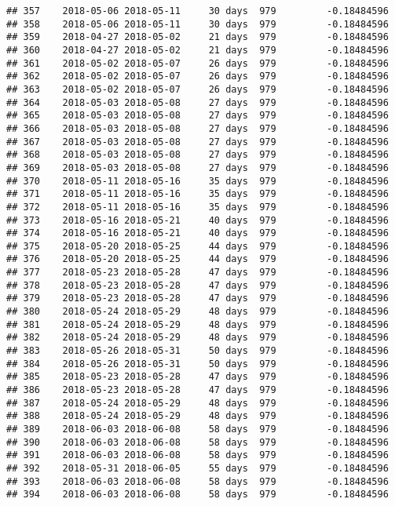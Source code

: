 \documentclass[]{article}
\begin{document}
\begin{verbatim}
## 357    2018-05-06 2018-05-11     30 days  979         -0.18484596
## 358    2018-05-06 2018-05-11     30 days  979         -0.18484596
## 359    2018-04-27 2018-05-02     21 days  979         -0.18484596
## 360    2018-04-27 2018-05-02     21 days  979         -0.18484596
## 361    2018-05-02 2018-05-07     26 days  979         -0.18484596
## 362    2018-05-02 2018-05-07     26 days  979         -0.18484596
## 363    2018-05-02 2018-05-07     26 days  979         -0.18484596
## 364    2018-05-03 2018-05-08     27 days  979         -0.18484596
## 365    2018-05-03 2018-05-08     27 days  979         -0.18484596
## 366    2018-05-03 2018-05-08     27 days  979         -0.18484596
## 367    2018-05-03 2018-05-08     27 days  979         -0.18484596
## 368    2018-05-03 2018-05-08     27 days  979         -0.18484596
## 369    2018-05-03 2018-05-08     27 days  979         -0.18484596
## 370    2018-05-11 2018-05-16     35 days  979         -0.18484596
## 371    2018-05-11 2018-05-16     35 days  979         -0.18484596
## 372    2018-05-11 2018-05-16     35 days  979         -0.18484596
## 373    2018-05-16 2018-05-21     40 days  979         -0.18484596
## 374    2018-05-16 2018-05-21     40 days  979         -0.18484596
## 375    2018-05-20 2018-05-25     44 days  979         -0.18484596
## 376    2018-05-20 2018-05-25     44 days  979         -0.18484596
## 377    2018-05-23 2018-05-28     47 days  979         -0.18484596
## 378    2018-05-23 2018-05-28     47 days  979         -0.18484596
## 379    2018-05-23 2018-05-28     47 days  979         -0.18484596
## 380    2018-05-24 2018-05-29     48 days  979         -0.18484596
## 381    2018-05-24 2018-05-29     48 days  979         -0.18484596
## 382    2018-05-24 2018-05-29     48 days  979         -0.18484596
## 383    2018-05-26 2018-05-31     50 days  979         -0.18484596
## 384    2018-05-26 2018-05-31     50 days  979         -0.18484596
## 385    2018-05-23 2018-05-28     47 days  979         -0.18484596
## 386    2018-05-23 2018-05-28     47 days  979         -0.18484596
## 387    2018-05-24 2018-05-29     48 days  979         -0.18484596
## 388    2018-05-24 2018-05-29     48 days  979         -0.18484596
## 389    2018-06-03 2018-06-08     58 days  979         -0.18484596
## 390    2018-06-03 2018-06-08     58 days  979         -0.18484596
## 391    2018-06-03 2018-06-08     58 days  979         -0.18484596
## 392    2018-05-31 2018-06-05     55 days  979         -0.18484596
## 393    2018-06-03 2018-06-08     58 days  979         -0.18484596
## 394    2018-06-03 2018-06-08     58 days  979         -0.18484596

\end{verbatim}
\end{document}
